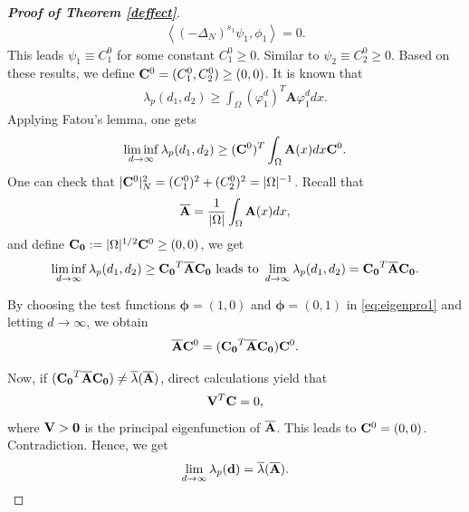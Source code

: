 \documentclass[a4paper,11pt]{amsart}
\theoremstyle{definition}
\def\O{\Omega}
\numberwithin{equation}{section}
\theoremstyle{definition}
\def\O{\Omega}
\begin{document}
\begin{proof} [\bf Proof of Theorem \ref{deffect}]
\begin{align*}
\left<(-\Delta_N)^{s_1}\psi_1,\phi_1\right>=0.
\end{align*}
This leads $\psi_1\equiv C_1^0$ for some constant $C_1^0\geq 0$. Similar to $\psi_2\equiv C_2^0\geq 0$. Based on these results, we define ${\bf C}^0=(C_1^0,C_2^0)\geq (0,0)$. It is known that
\begin{align*}
 \lambda_p(d_1,d_2)\geq \int_{\O}(\varphi_{1}^d)^T\textbf{A}\varphi_{1}^ddx.
\end{align*}
Applying Fatou's lemma, one gets
\begin{align*}
\liminf_{d\rightarrow \infty}\lambda_p(d_1,d_2)\geq ({\bf C}^0)^T\int_{\O}{\bf A}(x)dx{\bf C}^0.
\end{align*}
One can check that $|{\bf C}^0|_N^2=(C_1^0)^2+(C_2^0)^2=|\O|^{-1}$. Recall that
\begin{align*}
\overline{\bf A}=\dfrac{1}{|\O|}\int_{\O}{\bf A}(x)dx,
\end{align*}
and define ${\bf C_0}:=|\O|^{1/2}{\bf C}^0\geq (0,0)$, we get
\begin{align*}
\liminf_{d\rightarrow \infty}\lambda_p(d_1,d_2)\geq {\bf C_0}^T\overline{\bf A}{\bf C_0} \text{ leads to } \lim_{d\rightarrow \infty}\lambda_p(d_1,d_2)={\bf C_0}^T\overline{\bf A}{\bf C_0}.
\end{align*}


By choosing the test functions $\boldsymbol{\phi}=(1,0)$ and $\boldsymbol{\phi}=(0,1)$ in \eqref{eq:eigenpro1} and letting $d\to\infty$, we obtain
\begin{align*}
\overline{\bf A}{\bf C}^0 = ({\bf C_0}^T\overline{\bf A}{\bf C_0}) {\bf C}^0.
\end{align*}

Now, if $({\bf C_0}^T\overline{\bf A}{\bf C_0})\neq \overline{\lambda}(\overline{\bf A})$, direct calculations yield that
\begin{align*}
{\bf V }^T {\bf C}=0,
\end{align*}
where ${\bf V }>\textbf{0}$ is the principal eigenfunction of $\overline{\bf A}$. This leads to ${\bf C}^0=(0,0)$. Contradiction. Hence, we get
\begin{align*}
\lim_{d\rightarrow \infty}\lambda_p({\bf d})=\overline{\lambda}(\overline{\bf A}).
\end{align*}




\end{proof}
\end{document}

